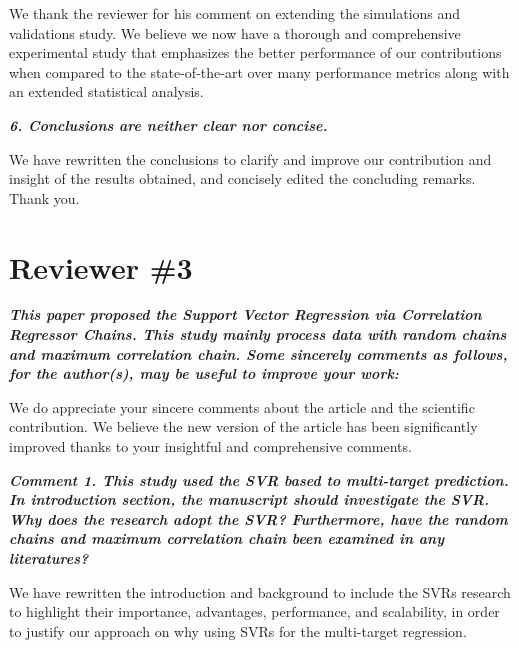 \documentclass[a4paper,notitlepage]{article}
\begin{document}
\noindent We thank the reviewer for his comment on extending the simulations and validations study. We believe we now have a thorough and comprehensive experimental study that emphasizes the better performance of our contributions when compared to the state-of-the-art over many performance metrics along with an extended statistical analysis.
 
\noindent \textbf{\textit{6. Conclusions are neither clear nor concise.}}
 
\medskip

\noindent We have rewritten the conclusions to clarify and improve our contribution and insight of the results obtained, and concisely edited the concluding remarks. Thank you.

\section{Reviewer \#3}

\noindent \textbf{\textit{This paper proposed the Support Vector Regression via Correlation Regressor Chains. This study mainly process data with random chains and maximum correlation chain. Some sincerely comments as follows, for the author(s), may be useful to improve your work:}}

\medskip

\noindent We do appreciate your sincere comments about the article and the scientific contribution. We believe the new version of the article has been significantly improved thanks to your insightful and comprehensive comments. 

\noindent \textbf{\textit{Comment 1. This study used the SVR based to multi-target prediction. In introduction section, the manuscript should investigate the SVR. Why does the research adopt the SVR? Furthermore, have the random chains and maximum correlation chain been examined in any literatures?}}

\medskip

\noindent We have rewritten the introduction and background to include the SVRs research to highlight their importance, advantages, performance, and scalability, in order to justify our approach on why using SVRs for the multi-target regression.
\end{document}
